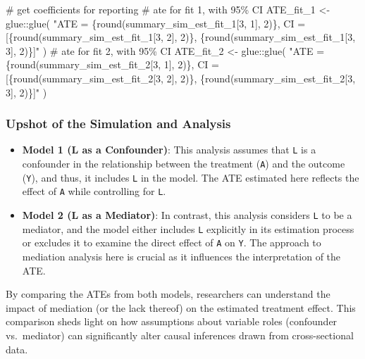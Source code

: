 \documentclass[
  singlecolumn]{article}
\newenvironment{Shaded}{}{}
\newcommand{\CommentTok}[1]{\textcolor[rgb]{0.42,0.45,0.49}{#1}}
\newcommand{\FunctionTok}[1]{\textcolor[rgb]{0.44,0.26,0.76}{#1}}
\newcommand{\NormalTok}[1]{\textcolor[rgb]{0.14,0.16,0.18}{#1}}
\newcommand{\OtherTok}[1]{\textcolor[rgb]{0.44,0.26,0.76}{#1}}
\newcommand{\SpecialCharTok}[1]{\textcolor[rgb]{0.00,0.36,0.77}{#1}}
\newcommand{\StringTok}[1]{\textcolor[rgb]{0.01,0.18,0.38}{#1}}
\begin{document}
\begin{Shaded}
\begin{Highlighting}[]
\CommentTok{\# get coefficients for reporting}
\CommentTok{\# ate for fit 1, with 95\% CI}
\NormalTok{ATE\_fit\_1 }\OtherTok{\textless{}{-}}\NormalTok{ glue}\SpecialCharTok{::}\FunctionTok{glue}\NormalTok{(}
  \StringTok{"ATE =}
\StringTok{                        \{round(summary\_sim\_est\_fit\_1[3, 1], 2)\},}
\StringTok{                        CI = [\{round(summary\_sim\_est\_fit\_1[3, 2], 2)\},}
\StringTok{                        \{round(summary\_sim\_est\_fit\_1[3, 3], 2)\}]"}
\NormalTok{)}
\CommentTok{\# ate for fit 2, with 95\% CI}
\NormalTok{ATE\_fit\_2 }\OtherTok{\textless{}{-}}
\NormalTok{  glue}\SpecialCharTok{::}\FunctionTok{glue}\NormalTok{(}
    \StringTok{"ATE = \{round(summary\_sim\_est\_fit\_2[3, 1], 2)\},}
\StringTok{                        CI = [\{round(summary\_sim\_est\_fit\_2[3, 2], 2)\},}
\StringTok{                        \{round(summary\_sim\_est\_fit\_2[3, 3], 2)\}]"}
\NormalTok{  )}
\end{Highlighting}
\end{Shaded}

\subsubsection{Upshot of the Simulation and
Analysis}\label{upshot-of-the-simulation-and-analysis}

\begin{itemize}
\item
  \textbf{Model 1 (L as a Confounder)}: This analysis assumes that
  \texttt{L} is a confounder in the relationship between the treatment
  (\texttt{A}) and the outcome (\texttt{Y}), and thus, it includes
  \texttt{L} in the model. The ATE estimated here reflects the effect of
  \texttt{A} while controlling for \texttt{L}.
\item
  \textbf{Model 2 (L as a Mediator)}: In contrast, this analysis
  considers \texttt{L} to be a mediator, and the model either includes
  \texttt{L} explicitly in its estimation process or excludes it to
  examine the direct effect of \texttt{A} on \texttt{Y}. The approach to
  mediation analysis here is crucial as it influences the interpretation
  of the ATE.
\end{itemize}

By comparing the ATEs from both models, researchers can understand the
impact of mediation (or the lack thereof) on the estimated treatment
effect. This comparison sheds light on how assumptions about variable
roles (confounder vs.~mediator) can significantly alter causal
inferences drawn from cross-sectional data.
\end{document}
